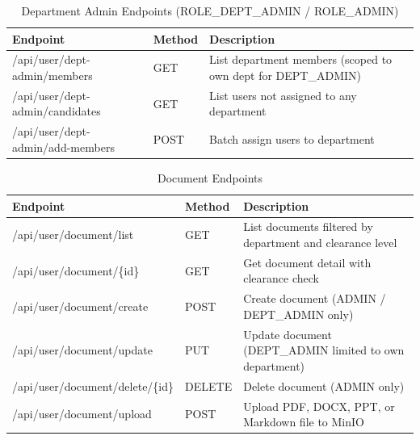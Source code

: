 \begin{table}[H]
\small\singlespacing
\centering
\caption{Department Admin Endpoints (ROLE\_DEPT\_ADMIN / ROLE\_ADMIN)}
\label{tab:api-dept-admin}
\begin{tabularx}{\textwidth}{>{\RaggedRight\arraybackslash}p{}>{\RaggedRight\arraybackslash}p{1.3cm}>{\RaggedRight\arraybackslash}X}
\toprule
\textbf{Endpoint} & \textbf{Method} & \textbf{Description} \\
\midrule
/api/user/dept-admin/members & GET & List department members (scoped to own dept for DEPT\_ADMIN) \\
/api/user/dept-admin/candidates & GET & List users not assigned to any department \\
/api/user/dept-admin/add-members & POST & Batch assign users to department \\
\bottomrule
\end{tabularx}
\end{table}

\begin{table}[H]
\small\singlespacing
\centering
\caption{Document Endpoints}
\label{tab:api-documents}
\begin{tabularx}{\textwidth}{>{\RaggedRight\arraybackslash}p{}>{\RaggedRight\arraybackslash}p{1.3cm}>{\RaggedRight\arraybackslash}X}
\toprule
\textbf{Endpoint} & \textbf{Method} & \textbf{Description} \\
\midrule
/api/user/document/list & GET & List documents filtered by department and clearance level \\
/api/user/document/\{id\} & GET & Get document detail with clearance check \\
/api/user/document/create & POST & Create document (ADMIN / DEPT\_ADMIN only) \\
/api/user/document/update & PUT & Update document (DEPT\_ADMIN limited to own department) \\
/api/user/document/delete/\{id\} & DELETE & Delete document (ADMIN only) \\
/api/user/document/upload & POST & Upload PDF, DOCX, PPT, or Markdown file to MinIO \\
\bottomrule
\end{tabularx}
\end{table}

